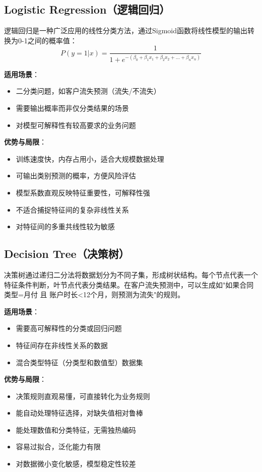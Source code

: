 \documentclass{article}
\begin{document}
\subsection{Logistic Regression（逻辑回归）}
逻辑回归是一种广泛应用的线性分类方法，通过Sigmoid函数将线性模型的输出转换为0-1之间的概率值：
\begin{equation}
P(y=1|x) = \frac{1}{1 + e^{-(\beta_0 + \beta_1 x_1 + \beta_2 x_2 + ... + \beta_n x_n)}}
\end{equation}

\textbf{适用场景}：
\begin{itemize}
    \item 二分类问题，如客户流失预测（流失/不流失）
    \item 需要输出概率而非仅分类结果的场景
    \item 对模型可解释性有较高要求的业务问题
\end{itemize}

\textbf{优势与局限}：
\begin{itemize}
    \item 训练速度快，内存占用小，适合大规模数据处理
    \item 可输出类别预测的概率，方便风险评估
    \item 模型系数直观反映特征重要性，可解释性强
    \item 不适合捕捉特征间的复杂非线性关系
    \item 对特征间的多重共线性较为敏感
\end{itemize}

\subsection{Decision Tree（决策树）}
决策树通过递归二分法将数据划分为不同子集，形成树状结构。每个节点代表一个特征条件判断，叶节点代表分类结果。在客户流失预测中，可以生成如"如果合同类型=月付 且 账户时长<12个月，则预测为流失"的规则。

\textbf{适用场景}：
\begin{itemize}
    \item 需要高可解释性的分类或回归问题
    \item 特征间存在非线性关系的数据
    \item 混合类型特征（分类型和数值型）数据集
\end{itemize}

\textbf{优势与局限}：
\begin{itemize}
    \item 决策规则直观易懂，可直接转化为业务规则
    \item 能自动处理特征选择，对缺失值相对鲁棒
    \item 能处理数值和分类特征，无需独热编码
    \item 容易过拟合，泛化能力有限
    \item 对数据微小变化敏感，模型稳定性较差
\end{itemize}
\end{document}
